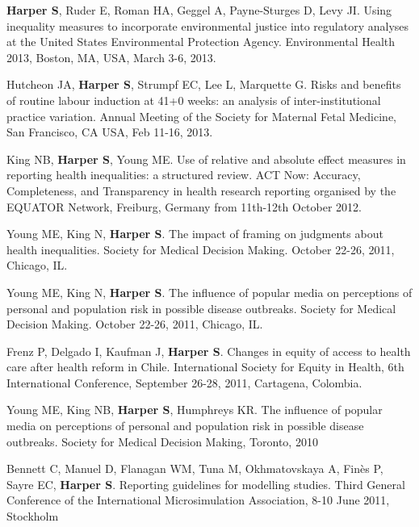 \documentclass[
  letterpaper,
  DIV=11,
  numbers=noendperiod]{scrartcl}
\begin{document}
\begin{etaremune}
\item   \textbf{Harper S}, Ruder E, Roman HA, Geggel A, Payne-Sturges D, Levy JI. Using inequality measures to incorporate environmental justice into regulatory analyses at the United States Environmental Protection Agency. Environmental Health 2013, Boston, MA, USA, March 3-6, 2013.

\item   Hutcheon JA, \textbf{Harper S}, Strumpf EC, Lee L, Marquette G. Risks and benefits of routine labour induction at 41+0 weeks: an analysis of inter-institutional practice variation. Annual Meeting of the Society for Maternal Fetal Medicine, San Francisco, CA USA, Feb 11-16, 2013.

\item King NB, \textbf{Harper S}, Young ME. Use of relative and absolute effect measures in reporting health inequalities: a structured review. ACT Now: Accuracy, Completeness, and Transparency in health research reporting organised by the EQUATOR Network, Freiburg, Germany from 11th-12th October 2012.

\item   Young ME, King N, \textbf{Harper S}. The impact of framing on judgments about health inequalities. Society for Medical Decision Making. October 22-26, 2011, Chicago, IL.

\item   Young ME, King N, \textbf{Harper S}. The influence of popular media on perceptions of personal and population risk in possible disease outbreaks. Society for Medical Decision Making. October 22-26, 2011, Chicago, IL.

\item   Frenz P, Delgado I, Kaufman J, \textbf{Harper S}. Changes in equity of access to health care after health reform in Chile. International Society for Equity in Health, 6th International Conference, September 26-28, 2011, Cartagena, Colombia.

\item   Young ME, King NB, \textbf{Harper S}, Humphreys KR. The influence of popular media on perceptions of personal and population risk in possible disease outbreaks. Society for Medical Decision Making, Toronto, 2010

\item   Bennett C, Manuel D, Flanagan WM, Tuna M, Okhmatovskaya A, Finès P, Sayre EC, \textbf{Harper S}. Reporting guidelines for modelling studies. Third General Conference of the International Microsimulation Association, 8-10 June 2011, Stockholm


\end{etaremune}
\end{document}
